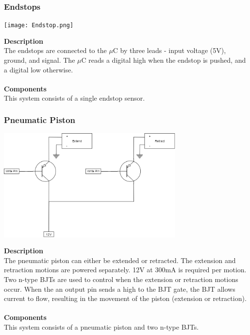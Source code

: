 \documentclass[titlepage]{article}
\begin{document}
\newpage
\subsubsection{Endstops}
\begin{center}
	\texttt{[image: Endstop.png]}
\label{fig:elecContextDiagramFig}
\end{center}
\textbf{Description}\\
The endstops are connected to the $\mu$C by three leads - input voltage (5V), ground, and signal. The $\mu$C reads a digital high when the endstop is pushed, and a digital low otherwise.\\\\
\textbf{Components}\\
This system consists of a single endstop sensor.

\subsubsection{Pneumatic Piston}
\begin{center}
	\includegraphics[width = 0.7\textwidth]{PneumaticPiston.png}
\label{fig:PneumaticPistonFig}
\end{center}
\textbf{Description}\\
The pneumatic piston can either be extended or retracted. The extension and retraction motions are powered separately. 12V at 300mA is required per motion. Two n-type BJTs are used to control when the extension or retraction motions occur. When the an output pin sends a high to the BJT gate, the BJT allows current to flow, resulting in the movement of the piston (extension or retraction).\\\\
\textbf{Components}\\
This system consists of a pneumatic piston and two n-type BJTs.
\end{document}
